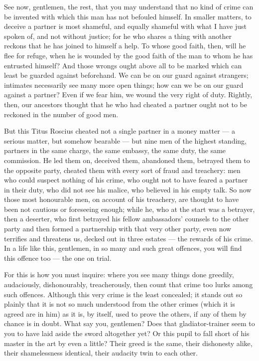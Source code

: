  See now, gentlemen, the rest, that you may understand that no kind of crime can be invented with which this man has not befouled himself. In smaller matters, to deceive a partner is most shameful, and equally shameful with what I have just spoken of, and not without justice; for he who shares a thing with another reckons that he has joined to himself a help. To whose good faith, then, will he flee for refuge, when he is wounded by the good faith of the man to whom he has entrusted himself? And those wrongs ought above all to be marked which can least be guarded against beforehand. We can be on our guard against strangers; intimates necessarily see many more open things; how can we be on our guard against a partner? Even if we fear him, we wound the very right of duty. Rightly, then, our ancestors thought that he who had cheated a partner ought not to be reckoned in the number of good men.

 But this Titus Roscius cheated not a single partner in a money matter --- a serious matter, but somehow bearable --- but nine men of the highest standing, partners in the same charge, the same embassy, the same duty, the same commission. He led them on, deceived them, abandoned them, betrayed them to the opposite party, cheated them with every sort of fraud and treachery: men who could suspect nothing of his crime, who ought not to have feared a partner in their duty, who did not see his malice, who believed in his empty talk. So now those most honourable men, on account of his treachery, are thought to have been not cautious or foreseeing enough; while he, who at the start was a betrayer, then a deserter, who first betrayed his fellow ambassadors' counsels to the other party and then formed a partnership with that very other party, even now terrifies and threatens us, decked out in three estates --- the rewards of his crime. In a life like this, gentlemen, in so many and such great offences, you will find this offence too --- the one on trial.

 For this is how you must inquire: where you see many things done greedily, audaciously, dishonourably, treacherously, then count that crime too lurks among such offences. Although this very crime is the least concealed; it stands out so plainly that it is not so much understood from the other crimes (which it is agreed are in him) as it is, by itself, used to prove the others, if any of them by chance is in doubt. What say you, gentlemen? Does that gladiator-trainer seem to you to have laid aside the sword altogether yet? Or this pupil to fall short of his master in the art by even a little? Their greed is the same, their dishonesty alike, their shamelessness identical, their audacity twin to each other.

